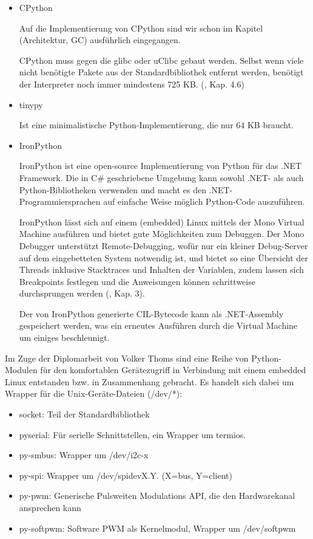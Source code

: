 \begin{itemize}

  \item CPython

        Auf die Implementierung von CPython sind wir schon im Kapitel
        (Architektur, GC) ausführlich eingegangen.

        CPython muss gegen die glibc oder uClibc gebaut werden. Selbst wenn
        viele nicht benötigte Pakete aus der Standardbibliothek entfernt
        werden, benötigt der Interpreter noch immer mindestens 725 KB.
        (\cite{embeddedlinux}, Kap. 4.6)

  \item tinypy

        Ist eine minimalistische Python-Implementierung, die nur 64 KB braucht.\cite{tinypy}
  \item IronPython

        IronPython ist eine open-source Implementierung von Python für das
        .NET Framework. Die in C\# geschriebene Umgebung kann sowohl .NET-
        als auch Python-Bibliotheken verwenden und macht es den
        .NET-Programmiersprachen auf einfache Weise möglich Python-Code
        auszuführen.

        IronPython lässt sich auf einem (embedded) Linux mittels der Mono
        Virtual Machine ausführen und bietet gute Möglichkeiten zum Debuggen.
        Der Mono Debugger unterstützt Remote-Debugging, wofür nur ein kleiner
        Debug-Server auf dem eingebetteten System notwendig ist, und bietet so
        eine Übersicht der Threads inklusive Stacktraces und Inhalten der
        Variablen, zudem lassen sich Breakpoints festlegen und die Anweisungen
        können schrittweise durchsprungen werden (\cite{ironpython}, Kap. 3).

        Der von IronPython generierte CIL-Bytecode kann als .NET-Assembly
        gespeichert werden, was ein erneutes Ausführen durch die Virtual
        Machine um einiges beschleunigt.

\end{itemize}


Im Zuge der Diplomarbeit von Volker Thoms \cite{dipl} sind eine Reihe von
Python-Modulen für den komfortablen Gerätezugriff in Verbindung mit einem
embedded Linux entstanden bzw. in Zusammenhang gebracht. Es handelt sich dabei
um Wrapper für die Unix-Geräte-Dateien (/dev/*):


\begin{itemize}

  \item socket: Teil der Standardbibliothek
  \item pyserial: Für serielle Schnittstellen, ein Wrapper um termios.
  \item py-smbus: Wrapper um /dev/i2c-x
  \item py-spi: Wrapper um /dev/spidevX.Y. (X=bus, Y=client)
  \item py-pwm: Generische Pulsweiten Modulations API, die den Hardwarekanal ansprechen kann
  \item py-softpwm: Software PWM als Kernelmodul, Wrapper um /dev/softpwm \cite{dipl}

\end{itemize}


